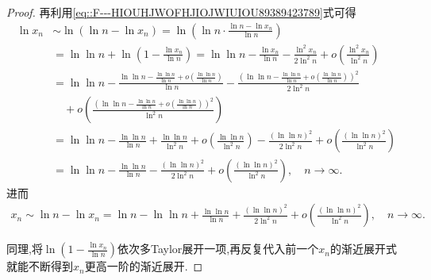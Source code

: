 \documentclass[../../main.tex]{subfiles}%
\begin{document}
\begin{proof}
再利用\eqref{eq::F---HIOUHJWOFHJIOJWIUIOU89389423789}式可得
\begin{align*}
\ln x_n&\sim \ln \left( \ln n-\ln x_n \right) =\ln \left( \ln n\cdot \frac{\ln n-\ln x_n}{\ln n} \right)\\
&=\ln\ln n+\ln \left( 1-\frac{\ln x_n}{\ln n} \right) =\ln\ln n-\frac{\ln x_n}{\ln n}-\frac{\ln ^2x_n}{2\ln ^2n}+o\left( \frac{\ln ^2x_n}{\ln ^2n} \right)\\
&=\ln\ln n-\frac{\ln\ln n-\frac{\ln\ln n}{\ln n}+o\left( \frac{\ln\ln n}{\ln n} \right)}{\ln n}-\frac{\left( \ln\ln n-\frac{\ln\ln n}{\ln n}+o\left( \frac{\ln\ln n}{\ln n} \right) \right) ^2}{2\ln ^2n}\\
&\quad +o\left( \frac{\left( \ln\ln n-\frac{\ln\ln n}{\ln n}+o\left( \frac{\ln\ln n}{\ln n} \right) \right) ^2}{\ln ^2n} \right)\\
&=\ln\ln n-\frac{\ln\ln n}{\ln n}+\frac{\ln\ln n}{\ln ^2n}+o\left( \frac{\ln\ln n}{\ln ^2n} \right) -\frac{\left( \ln\ln n \right) ^2}{2\ln ^2n}+o\left( \frac{\left( \ln\ln n \right) ^2}{\ln ^2n} \right)\\
&=\ln\ln n-\frac{\ln\ln n}{\ln n}-\frac{\left( \ln\ln n \right) ^2}{2\ln ^2n}+o\left( \frac{\left( \ln\ln n \right) ^2}{\ln ^2n} \right) ,\quad n\rightarrow \infty .
\end{align*}
进而
\begin{align*}
x_n\sim \ln n-\ln x_n=\ln n-\ln\ln n+\frac{\ln\ln n}{\ln n}+\frac{\left( \ln\ln n \right) ^2}{2\ln ^2n}+o\left( \frac{\left( \ln\ln n \right) ^2}{\ln ^2n} \right) ,\quad n\rightarrow \infty .
\end{align*}

同理,将$\ln \left( 1-\frac{\ln x_n}{\ln n} \right)$依次多Taylor展开一项,再反复代入前一个$x_n$的渐近展开式就能不断得到$x_n$更高一阶的渐近展开.

\end{proof}
\end{document}
